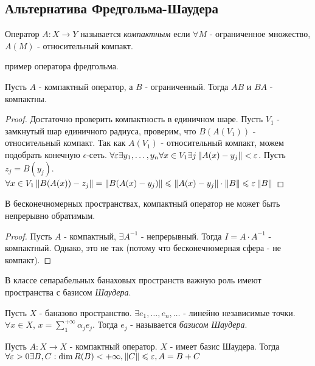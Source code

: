 \subsection{Альтернатива Фредгольма-Шаудера}

\begin{definition}
    Оператор $A: X \rightarrow Y$ называется \textit{компактным} если $\forall M$ - ограниченное множество, $A(M)$ - относительный компакт.
\end{definition}

\todo пример оператора фредгольма.

\begin{statement}
    Пусть $A$ - компактный оператор, а $B$ - ограниченный. Тогда $AB$ и $BA$ - компактны.
\end{statement}
 
\begin{proof}
    Достаточно проверить компактность в единичном шаре.
    Пусть $V_1$ - замкнутый шар единичного радиуса, проверим, что $B(A(V_1))$ - относительный компакт.
    Так как $A(V_1)$ - относительный компакт, можем подобрать конечную $\epsilon$-сеть. 
    $\forall \varepsilon \exists y_1,  \dots, y_n \forall x \in V_1 \exists j \left\|A(x) - y_j\right\| < \varepsilon$. Пусть $z_j = B(y_j)$. 
    $\forall x \in V_1 \left\|B(A(x)) - z_j\right\| = \left\|B(A(x) - y_j)\right\| \leqslant \left\|A(x) - y_j\right\| \cdot \left\|B\right\| \leqslant \varepsilon\left\|B\right\|$
\end{proof}

\begin{statement}
    В бесконечномерных пространствах, компактный оператор не может быть непрерывно обратимым.
\end{statement}
\begin{proof}
    Пусть $A$ - компактный, $\exists A^{-1}$ - непрерывный. Тогда $I = A\cdot A^{-1}$ - компактный. Однако, это не так (потому что бесконечномерная сфера - не компакт).
\end{proof}

В классе сепарабельных банаховых пространств важную роль имеют пространства с базисом \textit{Шаудера}.

\begin{definition}
    Пусть $X$ - баназово пространство. $\exists e_1, \dots, e_n, \dots$ - линейно независимые точки. $\forall x \in X$, $x = \sum_{1}^{+\infty} \alpha_j e_j$.
    Тогда ${e_j}$ - называется \textit{базисом Шаудера}.
\end{definition}

\begin{theorem}
    Пусть $A: X \rightarrow X$ - компактный оператор. $X$ - имеет базис Шаудера. Тогда 
    $\forall \varepsilon > 0 \exists B, C: \dim R(B) < +\infty, \left\|C\right\| \leqslant \varepsilon, A = B + C$
\end{theorem}

